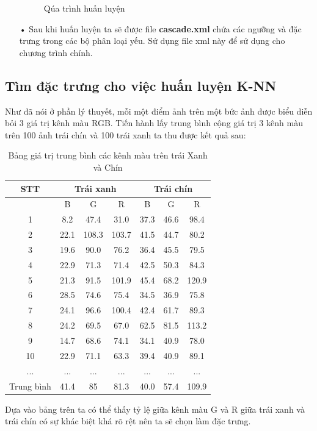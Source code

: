 \documentclass[12pt,a4paper]{article}
\begin{document}
\begin{itemize}
\begin{center}
\begin{figure}[htp]
\begin{center}
    \end{center}
    \caption{Qúa trình huấn luyện}
    \end{figure}
\end{center}
\item[•] Sau khi huấn luyện ta sẽ được file \textbf{cascade.xml} chứa các ngưỡng và đặc trưng trong các bộ phân loại yếu. Sử dụng file xml này để sử dụng cho chương trình chính.
\end{itemize}
\pagebreak
\subsection{Tìm đặc trưng cho việc huấn luyện K-NN}
Như đã nói ở phần lý thuyết, mỗi một điểm ảnh trên một bức ảnh được biểu diễn bỏi 3 giá trị kênh màu RGB. Tiến hành lấy trung bình cộng giá trị 3 kênh màu trên 100 ảnh trái chín và 100 trái xanh ta thu được kết quả sau:
\begin{center}
	\begin{table}[htp]
		\begin{center}
		\begin{tabular}{|c|c|c|c|c|c|c|}
		\hline
		STT & \multicolumn{3}{|c|}{Trái xanh} & \multicolumn{3}{|c|}{Trái chín}\\
		\hline
		  & B & G & R & B & G & R\\
		\hline
		1 & 8.2 & 47.4 & 31.0 & 37.3 & 46.6 & 98.4\\
		2 & 22.1 & 108.3 & 103.7 & 41.5 & 44.7 & 80.2\\
		3 & 19.6 & 90.0 & 76.2 & 36.4 & 45.5 & 79.5\\
		4 & 22.9 & 71.3 & 71.4 & 42.5 & 50.3 & 84.3\\
		5 & 21.3 & 91.5 & 101.9 & 45.4 & 68.2 & 120.9\\
		6 & 28.5 & 74.6 & 75.4 & 34.5 & 36.9 & 75.8\\
		7 & 24.1 & 96.6 & 100.4 & 42.4 & 61.7 & 89.3\\
		8 & 24.2 & 69.5 & 67.0 & 62.5 & 81.5 & 113.2\\
		9 & 14.7 & 68.6 & 74.1 & 34.1 & 40.9 & 78.0\\
		10 & 22.9 & 71.1 & 63.3 & 39.4 & 40.9 & 89.1\\
		... & ... & ... & ... & ... & ... & ...\\
		\hline
		Trung bình & 41.4 & 85 & 81.3 & 40.0 & 57.4 & 109.9\\
		\hline
		\end{tabular}
		\begin{center}
		\caption{Bảng giá trị trung bình các kênh màu trên trái Xanh và Chín}
		\end{center}
		\end{center}
	\end{table}
\end{center}
Dựa vào bảng trên ta có thể thấy tỷ lệ giữa kênh màu G và R giữa trái xanh và trái chín có sự khác biệt khá rõ rệt nên ta sẽ chọn làm đặc trưng.
\end{document}
